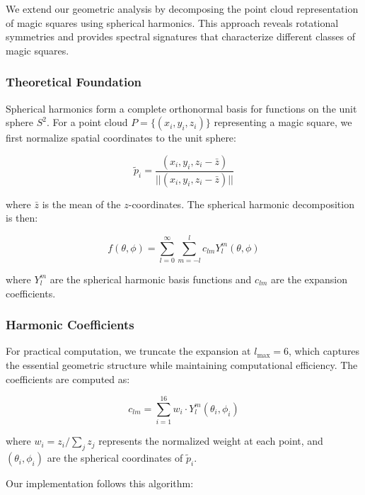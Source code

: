 We extend our geometric analysis by decomposing the point cloud representation of magic squares using spherical harmonics. This approach reveals rotational symmetries and provides spectral signatures that characterize different classes of magic squares.

\subsubsection{Theoretical Foundation}

Spherical harmonics form a complete orthonormal basis for functions on the unit sphere $S^2$. For a point cloud $P = \{(x_i, y_i, z_i)\}$ representing a magic square, we first normalize spatial coordinates to the unit sphere:

\[\tilde{p}_i = \frac{(x_i, y_i, z_i - \bar{z})}{||(x_i, y_i, z_i - \bar{z})||}\]

where $\bar{z}$ is the mean of the $z$-coordinates. The spherical harmonic decomposition is then:

\[f(\theta, \phi) = \sum_{l=0}^{\infty} \sum_{m=-l}^{l} c_{lm} Y_l^m(\theta, \phi)\]

where $Y_l^m$ are the spherical harmonic basis functions and $c_{lm}$ are the expansion coefficients.

\subsubsection{Harmonic Coefficients}

For practical computation, we truncate the expansion at $l_{\max} = 6$, which captures the essential geometric structure while maintaining computational efficiency. The coefficients are computed as:

\[c_{lm} = \sum_{i=1}^{16} w_i \cdot Y_l^m(\theta_i, \phi_i)\]

where $w_i = z_i/\sum_j z_j$ represents the normalized weight at each point, and $(\theta_i, \phi_i)$ are the spherical coordinates of $\tilde{p}_i$.

Our implementation follows this algorithm:

